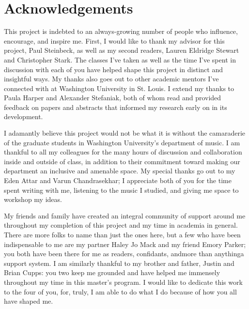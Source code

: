 \documentclass[12pt]{report}
\begin{document}
\thispagestyle{empty}

\frenchspacing %


\setcounter{page}{2}
    \tableofcontents
    \listoffigures
    \listoftables

    \chapter*{Acknowledgements}

This project is indebted to an always-growing number of people who influence, encourage, 
and inspire me. First, I would like to thank my advisor for this project, Paul Steinbeck, 
as well as my second readers, Lauren Eldridge Stewart and Christopher Stark. The classes 
I've taken as well as the time I've spent in discussion with each of you have helped shape
this project in distinct and insightful ways. My thanks also goes out to other academic 
mentors I've connected with at Washington University in St. Louis. I extend my thanks to 
Paula Harper and Alexander Stefaniak, both of whom read and provided feedback on papers 
and abstracts that informed my research early on in its development.
 
I adamantly believe this project would not be what it is without the camaraderie of the 
graduate students in Washington University's department of music. I am thankful to all my 
colleagues for the many hours of discussion and collaboration inside and outside of class,
in addition to their commitment toward making our department an inclusive and amenable space.
My special thanks go out to my Eden Attar and Varun Chandrasekhar; I appreciate both of you
for the time spent writing with me, listening to the music I studied, and giving me space to
workshop my ideas.

My friends and family have created an integral community of support around me throughout my 
completion of this project and my time in academia in general. There are more folks to name 
than just the ones here, but a few who have been indispensable to me are my partner Haley 
Jo Mack and my friend Emory Parker; you both have been there for me as readers, confidants, 
and\textemdash more than anything\textemdash a support system. I am similarly thankful to my 
brother and father, Justin and Brian Cupps: you two keep me grounded and have helped me
immensely throughout my time in this master's program. I would like to dedicate this work to
the four of you, for, truly, I am able to do what I do because of how you all have shaped me.
\end{document}
